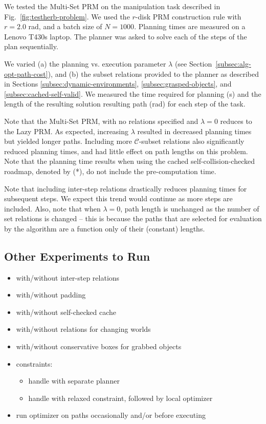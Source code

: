 We tested the Multi-Set PRM on the manipulation task
described in Fig.~\ref{fig:testherb-problem}.
We used the $r$-disk PRM construction rule with $r=2.0$ rad,
and a batch size of $N=1000$.
Planning times are measured on a Lenovo T430s laptop.
The planner was asked to solve each of the steps of the plan
sequentially.

We varied
(a) the planning vs. execution parameter $\lambda$
(see Section~\ref{subsec:alg-opt-path-cost}), and
(b) the subset relations provided to the planner
as described in Sections
\ref{subsec:dynamic-environments},
\ref{subsec:grasped-objects},
and \ref{subsec:cached-self-valid}.
We measured the time required for planning (s)
and the length of the resulting solution resulting path (rad)
for each step of the task.

Note that the Multi-Set PRM,
with no relations specified and $\lambda=0$
reduces to the Lazy PRM.
As expected,
increasing $\lambda$ resulted in decreased planning times
but yielded longer paths.
Including more $\mathcal{C}$-subset relations
also significantly reduced planning times,
and had little effect on path lengths on this problem.
Note that the planning time results when using
the cached self-collision-checked roadmap, denoted by (*),
do not include the pre-computation time.

Note that including inter-step relations drastically
reduces planning times for subsequent steps.
We expect this trend would continue as more steps are included.
Also, note that when $\lambda=0$,
path length is unchanged as the number of set relations is
changed
-- this is because the paths that are selected for evaluation
by the algorithm are a function only of their (constant) lengths.

\subsection{Other Experiments to Run}

\begin{itemize}
\item with/without inter-step relations
\item with/without padding
\item with/without self-checked cache
\item with/without relations for changing worlds
\item with/without conservative boxes for grabbed objects
\item constraints:
   \begin{itemize}
   \item handle with separate planner
   \item handle with relaxed constraint, followed by local optimizer
   \end{itemize}
\item run optimizer on paths occasionally and/or before executing
\end{itemize}


